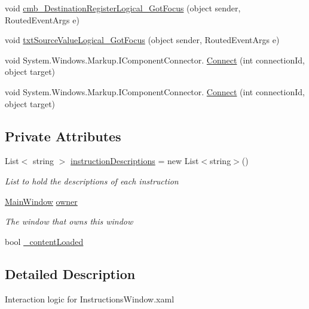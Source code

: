 \begin{DoxyCompactItemize}
\item 
void \hyperlink{class_c_p_u___o_s___simulator_1_1_instructions_window_a596ecf3b64608b39235b662565469b3e}{cmb\+\_\+\+Destination\+Register\+Logical\+\_\+\+Got\+Focus} (object sender, Routed\+Event\+Args e)
\item 
void \hyperlink{class_c_p_u___o_s___simulator_1_1_instructions_window_a1126bf0eb7a7e562d7c197a7300842d2}{txt\+Source\+Value\+Logical\+\_\+\+Got\+Focus} (object sender, Routed\+Event\+Args e)
\item 
void System.\+Windows.\+Markup.\+I\+Component\+Connector. \hyperlink{class_c_p_u___o_s___simulator_1_1_instructions_window_a0efa7624a59a6abc64d0940ffaa100b0}{Connect} (int connection\+Id, object target)
\item 
void System.\+Windows.\+Markup.\+I\+Component\+Connector. \hyperlink{class_c_p_u___o_s___simulator_1_1_instructions_window_a0efa7624a59a6abc64d0940ffaa100b0}{Connect} (int connection\+Id, object target)
\end{DoxyCompactItemize}
\subsection*{Private Attributes}
\begin{DoxyCompactItemize}
\item 
List$<$ string $>$ \hyperlink{class_c_p_u___o_s___simulator_1_1_instructions_window_a678ab4df2b78758142472eeed8c5d7ba}{instruction\+Descriptions} = new List$<$string$>$()
\begin{DoxyCompactList}\small\item\em List to hold the descriptions of each instruction \end{DoxyCompactList}\item 
\hyperlink{class_c_p_u___o_s___simulator_1_1_main_window}{Main\+Window} \hyperlink{class_c_p_u___o_s___simulator_1_1_instructions_window_a954c950c677c61a3b7ed7406b6dc7164}{owner}
\begin{DoxyCompactList}\small\item\em The window that owns this window \end{DoxyCompactList}\item 
bool \hyperlink{class_c_p_u___o_s___simulator_1_1_instructions_window_a7755282dffea134038e9e58c931dc297}{\+\_\+content\+Loaded}
\end{DoxyCompactItemize}


\subsection{Detailed Description}
Interaction logic for Instructions\+Window.\+xaml 

